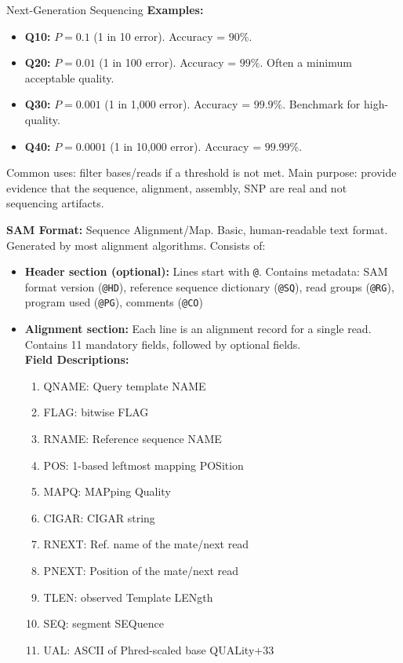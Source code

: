 \documentclass[twocolumn]{article}
\begin{document}
\begin{literaturepaper}{Next-Generation Sequencing \cite{gencore_how_sequencing_works}}
\textbf{Examples:}
\begin{itemize}
    \item \textbf{Q10:} $P=0.1$ (1 in 10 error). Accuracy = $90\%$.
    \item \textbf{Q20:} $P=0.01$ (1 in 100 error). Accuracy = $99\%$. Often a minimum acceptable quality.
    \item \textbf{Q30:} $P=0.001$ (1 in 1,000 error). Accuracy = $99.9\%$. Benchmark for high-quality.
    \item \textbf{Q40:} $P=0.0001$ (1 in 10,000 error). Accuracy = $99.99\%$.
\end{itemize}

Common uses: filter bases/reads if a threshold is not met.
Main purpose: provide evidence that the sequence, alignment, assembly, SNP are real and not sequencing artifacts.

\textbf{SAM Format:} Sequence Alignment/Map. Basic, human-readable text format. Generated by most alignment algorithms. Consists of:
\begin{itemize}
    \item \textbf{Header section (optional):} Lines start with \texttt{@}. Contains metadata: SAM format version (\texttt{@HD}), reference sequence dictionary (\texttt{@SQ}), read groups (\texttt{@RG}), program used (\texttt{@PG}), comments (\texttt{@CO})

    \item \textbf{Alignment section:} Each line is an alignment record for a single read. Contains 11 mandatory fields, followed by optional fields. \\

    \textbf{Field Descriptions:}

    \begin{enumerate}
        \item QNAME: Query template NAME
        \item FLAG: bitwise FLAG
        \item RNAME: Reference sequence NAME
        \item POS: 1-based leftmost mapping POSition
        \item MAPQ: MAPping Quality
        \item CIGAR: CIGAR string
        \item RNEXT: Ref. name of the mate/next read
        \item PNEXT: Position of the mate/next read
        \item TLEN: observed Template LENgth
        \item SEQ: segment SEQuence
        \item UAL: ASCII of Phred-scaled base QUALity+33
    \end{enumerate}


\end{itemize}
\end{literaturepaper}
\end{document}
